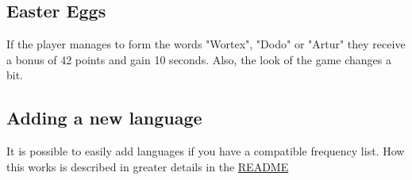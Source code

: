\documentclass{article}[12pt]
\begin{document}
    \subsection*{Easter Eggs}

    If the player manages to form the words "Wortex", "Dodo" or "Artur" they
    receive a bonus of 42 points and gain 10 seconds. Also, the look of the game
    changes a bit.

    \subsection*{Adding a new language}\label{Adding_a_new_language}
    It is possible to easily add languages if you have a compatible frequency list. How this works is described in greater details in the \href{https://github.com/donatienLeray/WortEx#add-your-own-language}{README}
\end{document}
